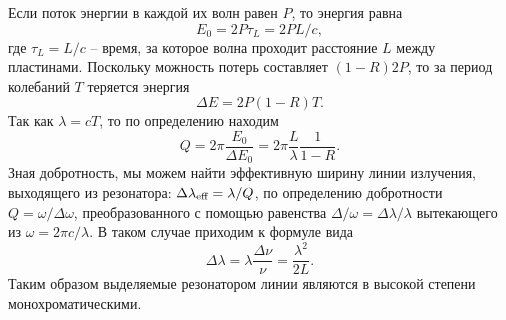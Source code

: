 Если поток энергии в каждой их волн равен $P$, то энергия равна 
\begin{equation*}
    E_0 = 2 P \tau_L = 2 P L/c,
\end{equation*}
где $\tau_L = L/c$ -- время, за которое волна проходит расстояние $L$ между пластинами. Поскольку можность потерь составляет $(1-R) 2 P$, то за период колебаний $T$ теряется энергия 
\begin{equation*}
    \Delta E = 2 P (1-R) T.
\end{equation*}
Так как $\lambda = c T$, то по определению находим
\begin{equation*}
    Q = 2 \pi \frac{E_0}{\Delta E_0} = 2 \pi \frac{L}{\lambda} \frac{1}{1-R}.
\end{equation*}
Зная добротность, мы можем найти эффективную ширину линии излучения, выходящего из резонатора:
$\Delta \lambda_{\textnormal{eff}} = \lambda/Q$, по определению добротности $Q = \omega / \Delta \omega$, преобразованного с помощью равенства $\Delta/\omega = \Delta \lambda/\lambda$ вытекающего из $\omega = 2 \pi c / \lambda$. В таком случае приходим к формуле вида
\begin{equation*}
    \Delta \lambda = \lambda \frac{\Delta \nu}{\nu} = \frac{\lambda^2}{2L}.
\end{equation*}
Таким образом выделяемые резонатором линии являются в высокой степени монохроматическими. 